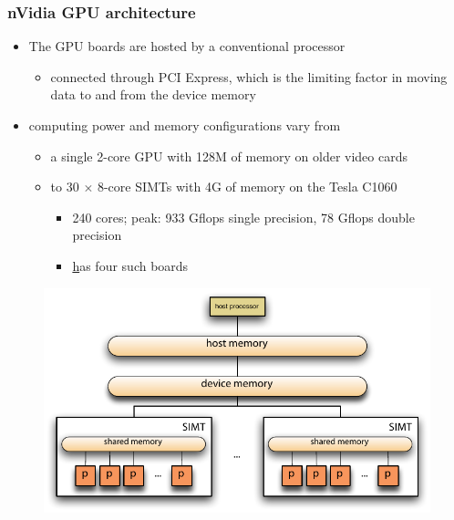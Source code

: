 \begin{frame}[fragile]
%
  \frametitle{nVidia GPU architecture}
%
  \begin{itemize}
  \item The GPU boards are hosted by a conventional processor
    \begin{itemize}
    \item connected through PCI Express, which is the limiting factor in moving data to and
      from the device memory
    \end{itemize}
  \item computing power and memory configurations vary from
    \begin{itemize}
    \item a single 2-core GPU with 128M of memory on older video cards
    \item to 30 $\times$ 8-core SIMTs with 4G of memory on the Tesla C1060
      \begin{itemize}
      \item 240 cores; peak: 933 Gflops single precision, 78 Gflops double precision
      \item \href{rivulet.cacr.caltech.edu} has four such boards
      \end{itemize}
    \end{itemize}
  \end{itemize}  
  
%
  \begin{figure}
    \centering
    \includegraphics[width=0.75\linewidth]{figures/cuda-architecture.pdf}
    \label{fig:simd}
  \end{figure}
%
\end{frame}


